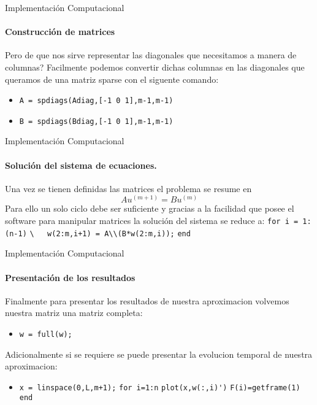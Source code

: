 \documentclass{beamer}
\begin{document}
\begin{frame}{Implementación Computacional}
\framesubtitle{Construcción de matrices}
Pero de que nos sirve representar las diagonales que necesitamos a manera de columnas?\newline
Facilmente podemos convertir dichas columnas en las diagonales que queramos de una matriz sparse con el siguente comando:
\begin{itemize}
	\item \lstinline[style=Matlab-editor]!A = spdiags(Adiag,[-1 0 1],m-1,m-1)!
	\item \lstinline[style=Matlab-editor]!B = spdiags(Bdiag,[-1 0 1],m-1,m-1)!
\end{itemize}
\end{frame}
\begin{frame}{Implementación Computacional}
\framesubtitle{Solución del sistema de ecuaciones.}
Una vez se tienen definidas las matrices el problema se resume en 
$$Au^{(m+1)}=Bu^{(m)}$$
Para ello un solo ciclo debe ser suficiente y gracias a la facilidad que posee el software para manipular matrices la solución del sistema se reduce a:\newline
\lstinline[style=Matlab-editor]!for i = 1: (n-1)!\newline
\lstinline[style=Matlab-editor]!\	w(2:m,i+1) = A\\(B*w(2:m,i));!\newline
\lstinline[style=Matlab-editor]!end!
\end{frame}
\begin{frame}{Implementación Computacional}
\framesubtitle{Presentación de los resultados}
Finalmente para presentar los resultados de nuestra aproximacion volvemos nuestra matriz una matriz completa:
\begin{itemize}
	\item \lstinline[style=Matlab-editor]!w = full(w);!
\end{itemize}
Adicionalmente si se requiere se puede presentar la evolucion temporal de nuestra aproximacion:
\begin{itemize}
	\item \lstinline[style=Matlab-editor]!x = linspace(0,L,m+1);! \newline
	\lstinline[style=Matlab-editor]!for i=1:n! \newline
	\lstinline[style=Matlab-editor]!plot(x,w(:,i)')! \newline
	\lstinline[style=Matlab-editor]!F(i)=getframe(1)! \newline
	\lstinline[style=Matlab-editor]!end! \newline
\end{itemize}
\end{frame}
\begin{frame}
\end{frame}
\begin{frame}
\end{frame}
\begin{frame}
\end{frame}
\end{document}
